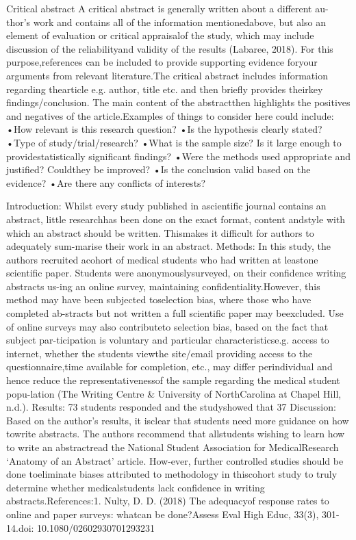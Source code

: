 Critical abstract
A critical abstract is generally written about a different au-thor’s work and contains all of the information mentionedabove, but also an element of evaluation or critical appraisalof the study, which may include discussion of the reliabilityand validity of the results (Labaree, 2018). For this purpose,references can be included to provide supporting evidence foryour arguments from relevant literature.The critical abstract includes information regarding thearticle e.g. author, title etc. and then briefly provides theirkey findings/conclusion. The main content of the abstractthen highlights the positives and negatives of the article.Examples of things to consider here could include:
•How relevant is this research question?
•Is the hypothesis clearly stated?
•Type of study/trial/research?
•What is the sample size? Is it large enough to providestatistically significant findings?
•Were the methods used appropriate and justified? Couldthey be improved?
•Is the conclusion valid based on the evidence?
•Are there any conflicts of interests?


Introduction: Whilst every study published in ascientific journal contains an abstract, little researchhas been done on the exact format, content andstyle with which an abstract should be written. Thismakes it difficult for authors to adequately sum-marise their work in an abstract.
Methods: In this study, the authors recruited acohort of medical students who had written at leastone scientific paper. Students were anonymouslysurveyed, on their confidence writing abstracts us-ing an online survey, maintaining confidentiality.However, this method may have been subjected toselection bias, where those who have completed ab-stracts but not written a full scientific paper may beexcluded. Use of online surveys may also contributeto selection bias, based on the fact that subject par-ticipation is voluntary and particular characteristicse.g. access to internet, whether the students viewthe site/email providing access to the questionnaire,time available for completion, etc., may differ perindividual and hence reduce the representativenessof the sample regarding the medical student popu-lation (The Writing Centre & University of NorthCarolina at Chapel Hill, n.d.).
Results:  73 students responded and the studyshowed that 37 %
Discussion: Based on the author’s results, it isclear that students need more guidance on how towrite abstracts. The authors recommend that allstudents wishing to learn how to write an abstractread the National Student Association for MedicalResearch ‘Anatomy of an Abstract’ article. How-ever, further controlled studies should be done toeliminate biases attributed to methodology in thiscohort study to truly determine whether medicalstudents lack confidence in writing abstracts.References:1. Nulty, D. D. (2018) The adequacyof response rates to online and paper surveys: whatcan be done?Assess Eval High Educ, 33(3), 301-14.doi: 10.1080/02602930701293231

